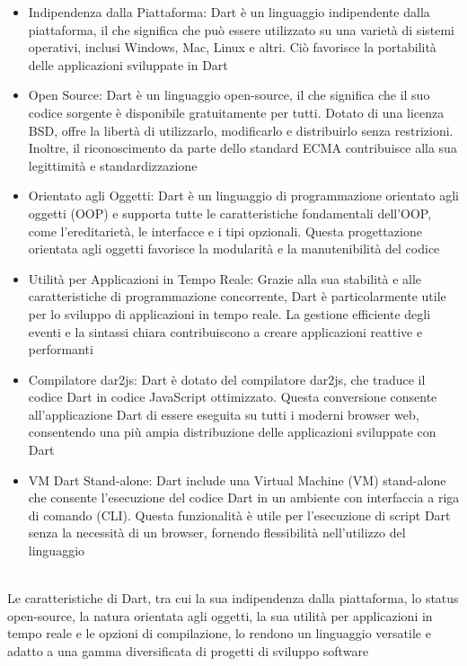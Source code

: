 \documentclass{report}
\begin{document}
\begin{itemize}
  \item{Indipendenza dalla Piattaforma:
Dart è un linguaggio indipendente dalla piattaforma, il che significa che può essere utilizzato su una varietà di sistemi operativi, inclusi Windows, Mac, Linux e altri. Ciò favorisce la portabilità delle applicazioni sviluppate in Dart}
  \item{Open Source:
Dart è un linguaggio open-source, il che significa che il suo codice sorgente è disponibile gratuitamente per tutti. Dotato di una licenza BSD, offre la libertà di utilizzarlo, modificarlo e distribuirlo senza restrizioni. Inoltre, il riconoscimento da parte dello standard ECMA contribuisce alla sua legittimità e standardizzazione}
  \item{Orientato agli Oggetti:
Dart è un linguaggio di programmazione orientato agli oggetti (OOP) e supporta tutte le caratteristiche fondamentali dell'OOP, come l'ereditarietà, le interfacce e i tipi opzionali. Questa progettazione orientata agli oggetti favorisce la modularità e la manutenibilità del codice}
  \item{Utilità per Applicazioni in Tempo Reale:
Grazie alla sua stabilità e alle caratteristiche di programmazione concorrente, Dart è particolarmente utile per lo sviluppo di applicazioni in tempo reale. La gestione efficiente degli eventi e la sintassi chiara contribuiscono a creare applicazioni reattive e performanti}
  \item{Compilatore dar2js:
Dart è dotato del compilatore dar2js, che traduce il codice Dart in codice JavaScript ottimizzato. Questa conversione consente all'applicazione Dart di essere eseguita su tutti i moderni browser web, consentendo una più ampia distribuzione delle applicazioni sviluppate con Dart}
  \item{VM Dart Stand-alone:
Dart include una Virtual Machine (VM) stand-alone che consente l'esecuzione del codice Dart in un ambiente con interfaccia a riga di comando (CLI). Questa funzionalità è utile per l'esecuzione di script Dart senza la necessità di un browser, fornendo flessibilità nell'utilizzo del linguaggio}
\end{itemize}
\\
Le caratteristiche di Dart, tra cui la sua indipendenza dalla piattaforma, lo status open-source, la natura orientata agli oggetti, la sua utilità per applicazioni in tempo reale e le opzioni di compilazione, lo rendono un linguaggio versatile e adatto a una gamma diversificata di progetti di sviluppo software
\end{document}
